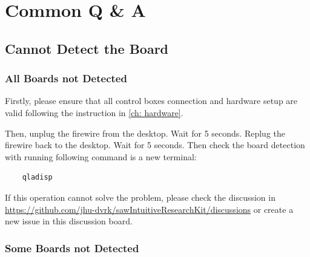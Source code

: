 
\chapter{Common Q \& A}
\label{ch: Q&A}

\section{Cannot Detect the Board}

\subsection{All Boards not Detected}

Firstly, please ensure that all control boxes connection and hardware setup are valid following the instruction in \autoref{ch: hardware}. 

Then, unplug the firewire from the desktop. Wait for 5 seconds. Replug the firewire back to the desktop. Wait for 5 seconds. Then check the board detection with running following command is a new terminal:

\begin{verbatim}
    qladisp
\end{verbatim}

If this operation cannot solve the problem, please check the discussion in \url{https://github.com/jhu-dvrk/sawIntuitiveResearchKit/discussions} or create a new issue in this discussion board.

\subsection{Some Boards not Detected}

